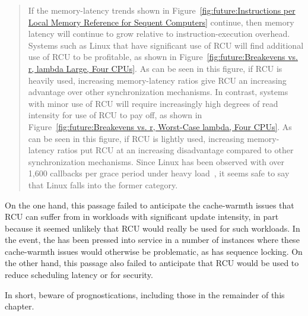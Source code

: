 \begin{quote}
	If the memory-latency trends shown in
	Figure~\ref{fig:future:Instructions per Local Memory Reference for Sequent Computers}
	continue, then memory latency will continue to grow relative
	to instruction-execution overhead.
	Systems such as Linux that have significant use of RCU will find
	additional use of RCU to be profitable, as shown in
	Figure~\ref{fig:future:Breakevens vs. r, lambda Large, Four CPUs}.
	As can be seen in this figure, if RCU is heavily used, increasing
	memory-latency ratios give RCU an increasing advantage over other
	synchronization mechanisms.
	In contrast, systems with minor
	use of RCU will require increasingly high degrees of read intensity
	for use of RCU to pay off, as shown in
	Figure~\ref{fig:future:Breakevens vs. r, Worst-Case lambda, Four CPUs}.
	As can be seen in this figure, if RCU is lightly used,
	increasing memory-latency ratios
	put RCU at an increasing disadvantage compared to other synchronization
	mechanisms.
	Since Linux has been observed with over 1,600 callbacks per grace
	period under heavy load~\cite{Sarma04c},
	it seems safe to say that Linux falls into the former category.
\end{quote}

On the one hand, this passage failed to anticipate the cache-warmth
issues that RCU can suffer from in workloads with significant update
intensity, in part because it seemed unlikely that RCU would really
be used for such workloads.
In the event, the  has been pressed into 
service in a number of instances where these cache-warmth issues would
otherwise be problematic, as has sequence locking.
On the other hand, this passage also failed to anticipate that
RCU would be used to reduce scheduling latency or for security.

In short, beware of prognostications, including those in the remainder
of this chapter.
